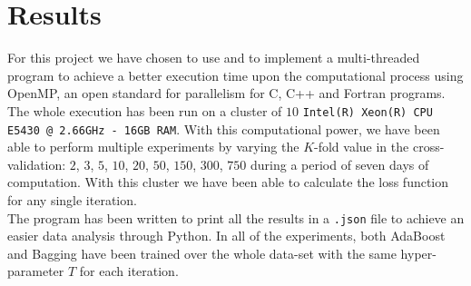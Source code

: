 
\chapter{Results}
\label{chap:results}
For this project we have chosen to use  and to implement a multi-threaded program to achieve a better execution time upon the computational process using OpenMP, an open standard for parallelism for C, C++ and Fortran programs. The whole execution has been run on a cluster of $10$ \texttt{Intel(R) Xeon(R) CPU E5430 @ 2.66GHz - 16GB RAM}. With this computational power, we have been able to perform multiple experiments by varying the $K$-fold value in the cross-validation: $2$, $3$, $5$, $10$, $20$, $50$, $150$, $300$, $750$ during a period of seven days of computation. With this cluster we have been able to calculate the loss function for any single iteration.\\
The program has been written to print all the results in a \texttt{.json} file to achieve an easier data analysis through Python. In all of the experiments, both AdaBoost and Bagging have been trained over the whole data-set with the same hyper-parameter $T$ for each iteration.\\
